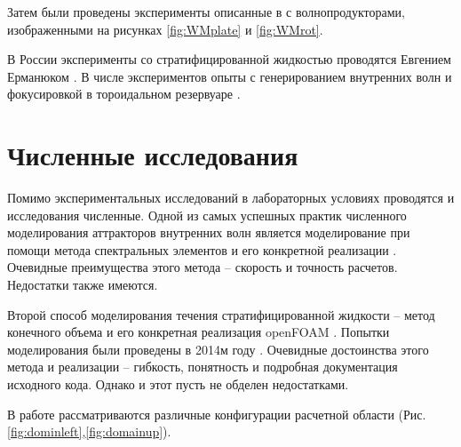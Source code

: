 Затем были проведены эксперименты описанные в \cite{Brouzet_2016,Brouzet2016,brouzet1997laboratory} с волнопродукторами, изображенными на рисунках \ref{fig:WMplate} и \ref{fig:WMrot}. 

В России эксперименты со стратифицированной жидкостью проводятся Евгением Ерманюком \cite{Shmakova2019}. В числе экспериментов опыты с генерированием внутренних волн \cite{Shmakova2017} и фокусировкой в тороидальном резервуаре \cite{Ermanyuk2017}.  

\section{Численные исследования}

Помимо экспериментальных исследований в лабораторных условиях проводятся и исследования численные. Одной из самых успешных практик численного моделирования аттракторов внутренних волн является моделирование при помощи метода спектральных элементов \cite{Brouzet2016} и его конкретной реализации \cite{NEK5000}. Очевидные преимущества этого метода -- скорость и точность расчетов. Недостатки также имеются.

Второй способ моделирования течения стратифицированной жидкости -- метод конечного объема и его конкретная реализация openFOAM \cite{OpenFOAM}. Попытки моделирования были проведены в 2014м году \cite{Brouzet2014}. Очевидные достоинства этого метода и реализации -- гибкость, понятность и подробная документация исходного кода. Однако и этот пусть не обделен недостатками.

В работе рассматриваются различные конфигурации расчетной области (Рис. \ref{fig:dominleft},\ref{fig:domainup}).

